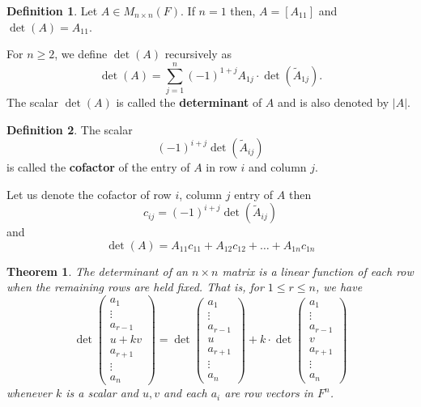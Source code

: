 \documentclass[12pt, a4paper]{article}
\newtheorem{theorem}{Theorem}[section]
\theoremstyle{definition}
\newtheorem{definition}{Definition}[section]
\theoremstyle{remark}
\begin{document}
    \begin{definition}
    Let $A \in M_{n \times n}(F)$. If $n = 1$ then, $A = [A_{11}]$ and $\det(A) = A_{11}$.

    For $n \ge 2$, we define $\det(A)$ recursively as
    \[
    \det(A) = \sum_{j=1}^{n} (-1)^{1+j} A_{1j} \cdot \det(\widetilde{A}_{1j}).
    \]
    The scalar $\det(A)$ is called the \textbf{determinant} of $A$ and is also denoted by $|A|$.
    \end{definition}

    \begin{definition}
    The scalar
    \[
    (-1)^{i+j} \det(\widetilde{A}_{ij})
    \]
    is called the \textbf{cofactor} of the entry of $A$ in row $i$ and column $j$.

    Let us denote the cofactor of row $i$, column $j$ entry of $A$ then
    \[
    c_{ij} = (-1)^{i+j} \det(\widetilde{A}_{ij})
    \]
    and
    \[
    \det(A) = A_{11}c_{11} + A_{12}c_{12} + \dots + A_{1n}c_{1n}
    \]
    \end{definition}

    \begin{theorem}
    The determinant of an $n \times n$ matrix is a linear function of each row when the remaining rows are held fixed. That is, for $1 \le r \le n$, we have
    \[
    \det \begin{pmatrix}
    a_1 \\
    \vdots \\
    a_{r-1} \\
    u + kv \\
    a_{r+1} \\
    \vdots \\
    a_n
    \end{pmatrix} 
    = 
    \det \begin{pmatrix}
    a_1 \\
    \vdots \\
    a_{r-1} \\
    u \\
    a_{r+1} \\
    \vdots \\
    a_n
    \end{pmatrix}
    + k \cdot \det \begin{pmatrix}
    a_1 \\
    \vdots \\
    a_{r-1} \\
    v \\
    a_{r+1} \\
    \vdots \\
    a_n
    \end{pmatrix}
    \]
    whenever $k$ is a scalar and $u, v$ and each $a_i$ are row vectors in $F^n$.
    \end{theorem}
\end{document}
